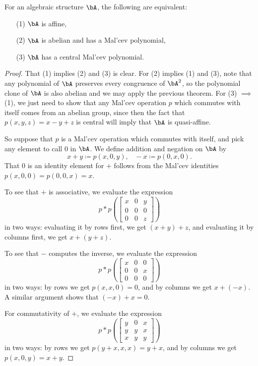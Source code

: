 \begin{thm} For an algebraic structure $\bA$, the following are equivalent:
\begin{itemize}
\item[(1)] $\bA$ is affine,

\item[(2)] $\bA$ is abelian and has a Mal'cev polynomial,

\item[(3)] $\bA$ has a central Mal'cev polynomial.
\end{itemize}
\end{thm}
\begin{proof} That (1) implies (2) and (3) is clear. For (2) implies (1) and (3), note that any polynomial of $\bA$ preserves every congruence of $\bA^2$, so the polynomial clone of $\bA$ is also abelian and we may apply the previous theorem. For (3) $\implies$ (1), we just need to show that any Mal'cev operation $p$ which commutes with itself comes from an abelian group, since then the fact that $p(x,y,z) = x-y+z$ is central will imply that $\bA$ is quasi-affine.

So suppose that $p$ is a Mal'cev operation which commutes with itself, and pick any element to call $0$ in $\bA$. We define addition and negation on $\bA$ by
\[
x+y \coloneqq p(x,0,y), \;\;\; -x \coloneqq p(0,x,0).
\]
That $0$ is an identity element for $+$ follows from the Mal'cev identities $p(x,0,0) = p(0,0,x) = x$.

To see that $+$ is associative, we evaluate the expression
\[
p*p\left(\begin{bmatrix} x & 0 & y\\ 0 & 0 & 0\\ 0 & 0 & z\end{bmatrix}\right)
\]
in two ways: evaluating it by rows first, we get $(x+y)+z$, and evaluating it by columns first, we get $x+(y+z)$.

To see that $-$ computes the inverse, we evaluate the expression
\[
p*p\left(\begin{bmatrix} x & 0 & 0\\ 0 & 0 & x\\ 0 & 0 & 0\end{bmatrix}\right)
\]
in two ways: by rows we get $p(x,x,0) = 0$, and by columns we get $x+(-x)$. A similar argument shows that $(-x)+x = 0$.

For commutativity of $+$, we evaluate the expression
\[
p*p\left(\begin{bmatrix} y & 0 & x\\ y & y & x\\ x & y & y\end{bmatrix}\right)
\]
in two ways: by rows we get $p(y+x,x,x) = y+x$, and by columns we get $p(x,0,y) = x+y$.


\end{proof}
